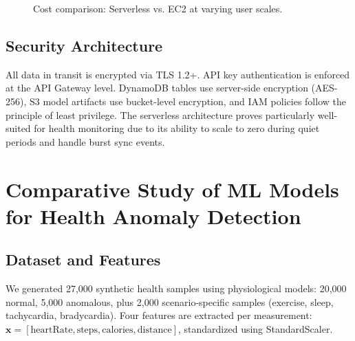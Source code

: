 \documentclass[conference]{IEEEtran}
\begin{document}
\begin{figure}[H]
\centering
{}
\caption{Cost comparison: Serverless vs. EC2 at varying user scales.}
\label{fig:cost}
\end{figure}

\subsection{Security Architecture}
All data in transit is encrypted via TLS 1.2+. API key authentication is enforced at the API Gateway level. DynamoDB tables use server-side encryption (AES-256), S3 model artifacts use bucket-level encryption, and IAM policies follow the principle of least privilege. The serverless architecture proves particularly well-suited for health monitoring due to its ability to scale to zero during quiet periods and handle burst sync events.



\section{Comparative Study of ML Models for Health Anomaly Detection}

\subsection{Dataset and Features}
We generated 27,000 synthetic health samples using physiological models: 20,000 normal, 5,000 anomalous, plus 2,000 scenario-specific samples (exercise, sleep, tachycardia, bradycardia). Four features are extracted per measurement: $\mathbf{x} = [\text{heartRate}, \text{steps}, \text{calories}, \text{distance}]$, standardized using StandardScaler.
\end{document}
